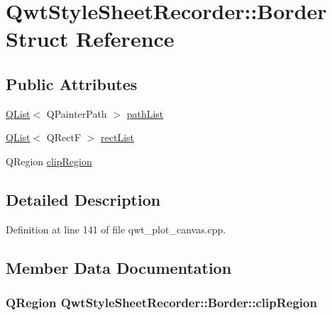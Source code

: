 \hypertarget{struct_qwt_style_sheet_recorder_1_1_border}{\section{Qwt\-Style\-Sheet\-Recorder\-:\-:Border Struct Reference}
\label{struct_qwt_style_sheet_recorder_1_1_border}
}
\subsection*{Public Attributes}
\begin{DoxyCompactItemize}
\item 
\hyperlink{class_q_list}{Q\-List}$<$ Q\-Painter\-Path $>$ \hyperlink{struct_qwt_style_sheet_recorder_1_1_border_a638e43af38697755dfd944f7083c4761}{path\-List}
\item 
\hyperlink{class_q_list}{Q\-List}$<$ Q\-Rect\-F $>$ \hyperlink{struct_qwt_style_sheet_recorder_1_1_border_a4a03e9d8c30c6ec671e7dadc9745789b}{rect\-List}
\item 
Q\-Region \hyperlink{struct_qwt_style_sheet_recorder_1_1_border_a8c9b87f21969ac7739f867259c2ca8dd}{clip\-Region}
\end{DoxyCompactItemize}


\subsection{Detailed Description}


Definition at line 141 of file qwt\-\_\-plot\-\_\-canvas.\-cpp.



\subsection{Member Data Documentation}
\hypertarget{struct_qwt_style_sheet_recorder_1_1_border_a8c9b87f21969ac7739f867259c2ca8dd}{
\subsubsection[{clip\-Region}]{\setlength{\rightskip}{0pt plus 5cm}Q\-Region Qwt\-Style\-Sheet\-Recorder\-::\-Border\-::clip\-Region}}\label{struct_qwt_style_sheet_recorder_1_1_border_a8c9b87f21969ac7739f867259c2ca8dd}


